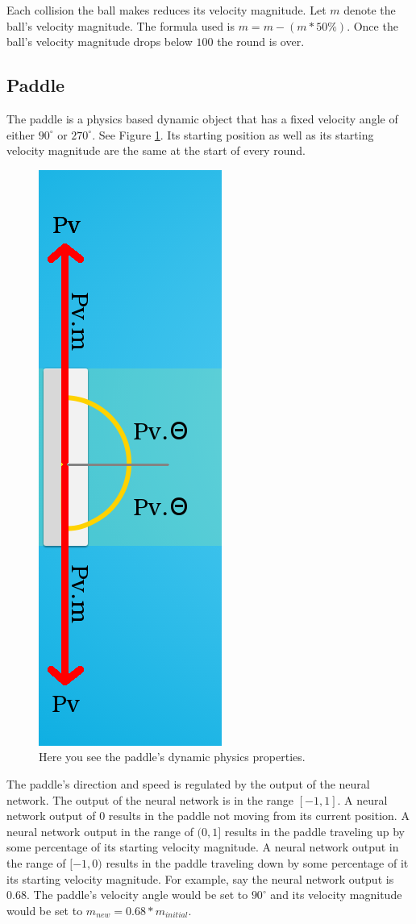 \documentclass[a4paper,10pt]{article}
\begin{document}
Each collision the ball makes reduces its velocity magnitude. Let $m$ denote the ball's velocity magnitude. The formula used is $m = m - (m * 50\%)$. Once the ball's velocity magnitude drops below $100$ the round is over.

\pagebreak

\subsection{Paddle}

The paddle is a physics based dynamic object that has a fixed velocity angle of either $90^\circ$ or $270^\circ$. See Figure \ref{fig:paddle}. Its starting position as well as its starting velocity magnitude are the same at the start of every round. 

\begin{figure}[H]  
  \centering
  \includegraphics[width=.3\textwidth]{figures/paddle.png}
  \caption{Here you see the paddle's dynamic physics properties.}
  \label{fig:paddle}
\end{figure}

The paddle's direction and speed is regulated by the output of the neural network. The output of the neural network is in the range $[-1,1]$. A neural network output of $0$ results in the paddle not moving from its current position. A neural network output in the range of $(0,1]$ results in the paddle traveling up by some percentage of its starting velocity magnitude. A neural network output in the range of $[-1,0)$ results in the paddle traveling down by some percentage of it its starting velocity magnitude. For example, say the neural network output is $0.68$. The paddle's velocity angle would be set to $90^\circ$ and its velocity magnitude would be set to $m_{new}=0.68*m_{initial}$.
\end{document}
